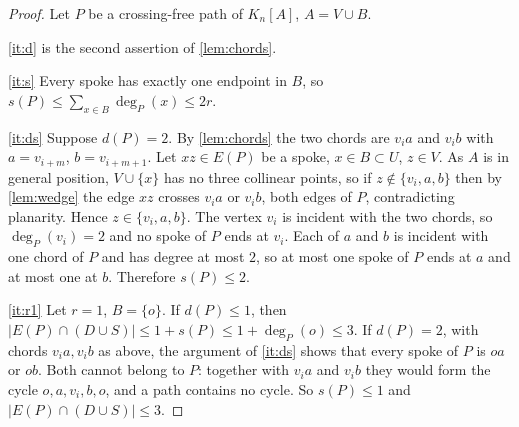 \documentclass[11pt,a4paper]{article}
\theoremstyle{plain}
\theoremstyle{definition}
\theoremstyle{remark}
\newcommand{\dP}{d}
\newcommand{\sP}{s}
\begin{document}
\label{pf:budget}
\lembudget*
\begin{proof}
Let $P$ be a crossing-free path of $K_n[A]$, $A=V\cup B$.

\ref{it:d} is the second assertion of \cref{lem:chords}.

\ref{it:s} Every spoke has exactly one endpoint in $B$, so $\sP(P)\le\sum_{x\in B}\deg_P(x)\le2r$.

\ref{it:ds} Suppose $\dP(P)=2$. By \cref{lem:chords} the two chords are $v_ia$ and $v_ib$ with $a=v_{i+m}$, $b=v_{i+m+1}$. Let $xz\in E(P)$ be a spoke, $x\in B\subset U$, $z\in V$. As $A$ is in general position, $V\cup\{x\}$ has no three collinear points, so if $z\notin\{v_i,a,b\}$ then by \cref{lem:wedge} the edge $xz$ crosses $v_ia$ or $v_ib$, both edges of $P$, contradicting planarity. Hence $z\in\{v_i,a,b\}$. The vertex $v_i$ is incident with the two chords, so $\deg_P(v_i)=2$ and no spoke of $P$ ends at $v_i$. Each of $a$ and $b$ is incident with one chord of $P$ and has degree at most $2$, so at most one spoke of $P$ ends at $a$ and at most one at $b$. Therefore $\sP(P)\le2$.

\ref{it:r1} Let $r=1$, $B=\{o\}$. If $\dP(P)\le1$, then $|E(P)\cap(D\cup S)|\le1+\sP(P)\le1+\deg_P(o)\le3$. If $\dP(P)=2$, with chords $v_ia,v_ib$ as above, the argument of \ref{it:ds} shows that every spoke of $P$ is $oa$ or $ob$. Both cannot belong to $P$: together with $v_ia$ and $v_ib$ they would form the cycle $o,a,v_i,b,o$, and a path contains no cycle. So $\sP(P)\le1$ and $|E(P)\cap(D\cup S)|\le3$.
\end{proof}
\end{document}
